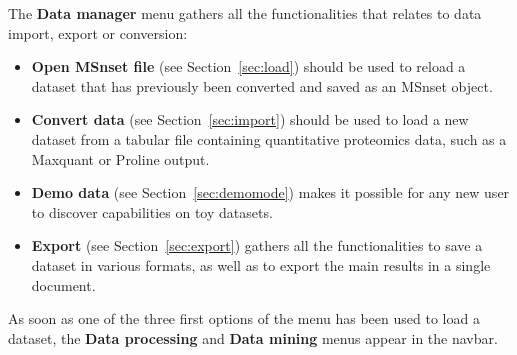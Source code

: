 \documentclass[12pt]{article}
\begin{document}
The \textbf{Data manager} menu gathers all the functionalities that relates to data import, export or conversion:
\begin{itemize}
	\item \textbf{Open MSnset file} (see Section~\ref{sec:load}) should be used to reload a dataset that has previously been converted and saved as an MSnset object.
	\item \textbf{Convert data} (see Section~\ref{sec:import}) should be used to load a new dataset from a tabular file containing quantitative proteomics data, such as a Maxquant or Proline output.
	\item \textbf{Demo data} (see Section~\ref{sec:demomode}) makes it possible for any new user to discover  capabilities on toy datasets.
	\item \textbf{Export} (see Section~\ref{sec:export}) gathers all the functionalities to save a dataset in various formats, as well as to export the main results in a single document.
\end{itemize}
As soon as one of the three first options of the menu has been used to load a dataset, the \textbf{Data processing} and \textbf{Data mining} menus appear in the navbar.
\end{document}
